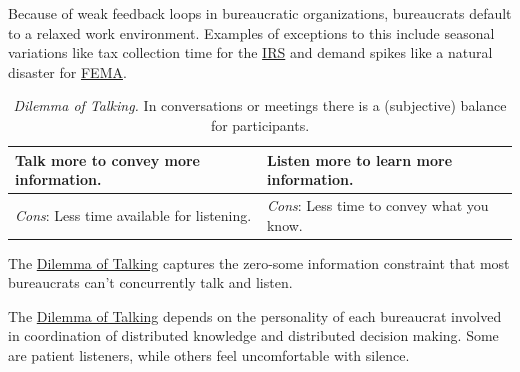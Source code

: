 Because of weak feedback loops in bureaucratic organizations, bureaucrats default to a relaxed work environment. Examples of exceptions to this include seasonal variations like tax collection time for the \href{https://en.wikipedia.org/wiki/Internal_Revenue_Service}{IRS} 
and demand spikes like a natural disaster for \href{https://en.wikipedia.org/wiki/Federal_Emergency_Management_Agency}{FEMA}. 

\begin{center}
\begin{table}[H] %
\begin{tabular}{ | m{\dilemmatablewidth}| m{\dilemmatablewidth} | } 
  \hline
  \textbf{Talk more to convey more information.} & 
  \textbf{Listen more to learn more information.} \\ 
  \hline
  \textit{Cons}: Less time available for listening. & 
  \textit{Cons}: Less time to convey what you know. \\  
  \hline
\end{tabular}
\caption{
\textit{Dilemma of Talking.}
In conversations or meetings there is a (subjective) balance for participants.
}
\label{table:talk-or-listen}
\end{table}
\end{center}

The \hyperref[table:talk-or-listen]{Dilemma of Talking} captures the zero-some information constraint that most bureaucrats can't concurrently talk and listen. 

The \hyperref[table:talk-or-listen]{Dilemma of Talking} depends on the personality of each bureaucrat involved in coordination of distributed knowledge and distributed decision making. Some are patient listeners, while others feel uncomfortable with silence.

